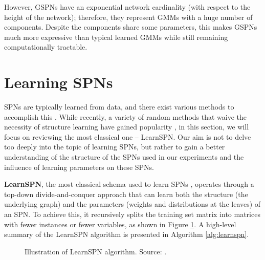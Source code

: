 However, GSPNs have an exponential network cardinality (with respect to the height of the network); therefore, they represent GMMs with a huge number of components. Despite the components share some parameters, this makes GSPNs much more expressive than typical learned GMMs while still remaining computationally tractable.

\section{Learning SPNs}
\label{sec:spn:learning}

SPNs are typically learned from data, and there exist various methods to accomplish this \citep{Peharz2015}. While recently, a variety of random methods that waive the necessity of structure learning have gained popularity \citep{Peharz2020, Geh2021}, in this section, we will focus on reviewing the most classical one -- LearnSPN. Our aim is not to delve too deeply into the topic of learning SPNs, but rather to gain a better understanding of the structure of the SPNs used in our experiments and the influence of learning parameters on these SPNs.

\textbf{LearnSPN}, the most classical schema used to learn SPNs \citep{Gens2013}, operates through a top-down divide-and-conquer approach that can learn both the structure (the underlying graph) and the parameters (weights and distributions at the leaves) of an SPN. To achieve this, it recursively splits the training set matrix into matrices with fewer instances or fewer variables, as shown in Figure \ref{fig:learnspn}. A high-level summary of the LearnSPN algorithm is presented in Algorithm \ref{alg:learnspn}.

\begin{figure}
  \centering

  \caption[LearnSPN schema]{Illustration of LearnSPN algorithm. Source: \citet{Gens2013}.}
  \label{fig:learnspn}
\end{figure}

